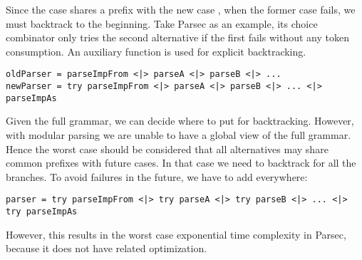 Since the  case shares a prefix with the new case , when the former case fails, we must backtrack to the beginning. Take Parsec as an example, its choice
combinator \inlinecode{<|>} only tries the second alternative if the first fails
without any token consumption. An auxiliary function  is used for explicit backtracking.

\begin{lstlisting}[language=PlainCode]
oldParser = parseImpFrom <|> parseA <|> parseB <|> ...
newParser = try parseImpFrom <|> parseA <|> parseB <|> ... <|> parseImpAs
\end{lstlisting}

Given the full grammar, we can decide where to put  for backtracking. However, with modular parsing we are unable to have a global view of the full grammar. Hence the worst case should be considered that all alternatives may share common prefixes with future cases. In that case we need to backtrack for all the branches. To avoid failures in the future, we have to add  everywhere:

\begin{lstlisting}[language=PlainCode]
parser = try parseImpFrom <|> try parseA <|> try parseB <|> ... <|> try parseImpAs
\end{lstlisting}

\noindent However, this results in the worst case exponential time complexity in Parsec, because it does not have related optimization.

